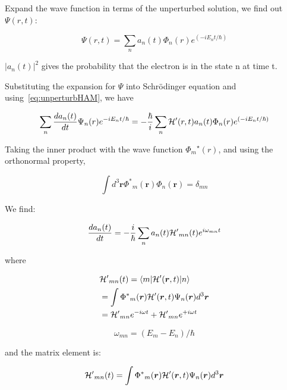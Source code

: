 Expand the wave function in terms of the unperturbed solution, we find out $\Psi(r,t)$:

\begin{equation}
  \Psi(r,t) = \sum_{n}a_n(t)\Phi_n(r)e^{(-iE_{n}t/\hbar)}
\end{equation}

$|a_n(t)|^2$ gives the probability that the electron is in the state n at time t.

Substituting the expansion for $\Psi$ into Schr{\"o}dinger equation and using~\ref{eq:unperturbHAM}, we have

\begin{equation}
  \sum_n \frac{da_n(t)}{dt}\Psi_n(r)e^{-iE_{n}t/\hbar} = -\frac{\hbar}{i}\sum_n \mathcal{H}^{\prime}(r,t)a_n(t)\Phi_n(r)e^{(-iE_{n}t/\hbar)}
\end{equation}

Taking the inner product with the wave function ${\Phi_m}^\star(r)$, and using
the orthonormal property,

\begin{equation}
  \int{d^3}\bm{r}{{\Phi^\ast}_m}(\bm{r})\Phi_n(\bm{r}) = \delta_{mn}
\end{equation}

We find:

\begin{equation}
\frac{d{a_n(t)}}{dt}=-\frac{i}{\hbar}\sum_{n}a_n(t){\mathcal{H}^\prime}_{mn}(t)e^{i\omega_{mn}t}
\end{equation}

where


\begin{eqnarray}
\begin{aligned}
  & {\HAM^\prime}_{mn}(t)=\langle{m}|\HAM^\prime(\bm{r},t)|{n}\rangle \\
  & = \int{\Phi^\ast}_m(\bm{r}){\HAM^\prime}(\bm{r},t)\Psi_n(\bm{r})d^3\bm{r} \\
  & = {\HAM^\prime}_{mn}e^{-i\omega{t}} + {\HAM^\prime}_{mn}e^{+i\omega{t}}
\end{aligned}
\label{eq:HAMintigral}
\end{eqnarray}

\begin{equation}
  {\omega_{mn}}=(E_m-E_n)/\hbar
\end{equation}

and the matrix element is:

\begin{equation}
  {\mathcal{H}^\prime}_{mn}(t)=\int{{\Phi^\ast}_m}(\bm{r})\mathcal{H}^\prime(\bm{r},t)\Psi_{n}(\bm{r})d^3\bm{r}
\end{equation}

